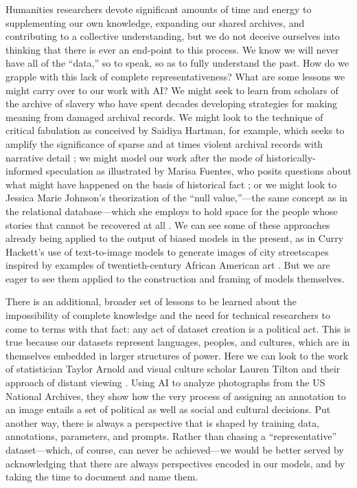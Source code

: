 Humanities researchers devote significant amounts of time and energy to supplementing our own knowledge, expanding our shared archives, and contributing to a collective understanding, but we do not deceive ourselves into thinking that there is ever an end-point to this process. We know we will never have all of the ``data,'' so to speak, so as to fully understand the past. How do we grapple with this lack of complete representativeness? What are some lessons we might carry over to our work with AI? We might seek to learn from scholars of the archive of slavery who have spent decades developing strategies for making meaning from damaged archival records. We might look to the technique of critical fabulation as conceived by Saidiya Hartman, for example, which seeks to amplify the significance of sparse and at times violent archival records with narrative detail \cite{Hartman_2020}; we might model our work after the mode of historically-informed speculation as illustrated by Marisa Fuentes, who posits questions about what might have happened on the basis of historical fact \cite{fuentes_2016}; or we might look to Jessica Marie Johnson’s theorization of the ``null value,''---the same concept as in the relational database---which she employs to hold space for the people whose stories that cannot be recovered at all \cite{Johnson_2020}. We can see some of these approaches already being applied to the output of biased models in the present, as in Curry Hackett’s use of text-to-image models to generate images of city streetscapes inspired by examples of twentieth-century African American art \cite{noauthor_architect_2023}. But we are eager to see them applied to the construction and framing of models themselves. 

There is an additional, broader set of lessons to be learned about the impossibility of complete knowledge and the need for technical researchers to come to terms with that fact: any act of dataset creation is a political act. This is true because our datasets represent languages, peoples, and cultures, which are in themselves embedded in larger structures of power. Here we can look to the work of statistician Taylor Arnold and visual culture scholar Lauren Tilton and their approach of distant viewing \cite{Arnold_2023}. Using AI to analyze photographs from the US National Archives, they show how the very process of assigning an annotation to an image entails a set of political as well as social and cultural decisions. Put another way, there is always a perspective that is shaped by training data, annotations, parameters, and prompts. Rather than chasing a ``representative'' dataset---which, of course, can never be achieved---we would be better served by acknowledging that there are always perspectives encoded in our models, and by taking the time to document and name them. 